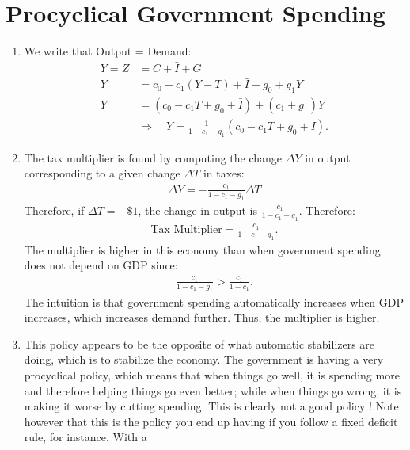 \documentclass[]{book}
\theoremstyle{definition}
\theoremstyle{definition}
\theoremstyle{definition}
\theoremstyle{remark}
\begin{document}
\section*{Procyclical Government
Spending}\label{procyclical-government-spending-1}

\begin{enumerate}
\def\labelenumi{\arabic{enumi}.}
\item
  We write that Output = Demand: \[
  \begin{aligned}
  Y=Z &=C+\bar{I}+G\\
  Y   &=c_{0}+c_{1}\left(Y-T\right)+ \bar{I} + g_{0}+g_{1}Y\\
  Y   &=\left(c_{0}-c_{1}T+g_{0}+\bar{I}\right)+\left(c_{1}+g_{1}\right)Y \\
  & \Rightarrow \quad \boxed{Y=\frac{1}{1-c_{1}-g_{1}}\left(c_{0}-c_{1}T+g_{0}+\bar{I}\right)}.
  \end{aligned}
  \]
\item
  The tax multiplier is found by computing the change \(\Delta Y\) in
  output corresponding to a given change \(\Delta T\) in taxes: \[
  \begin{aligned}
  \Delta Y = -\frac{c_1}{1-c_1-g_1}\Delta T
  \end{aligned}
  \] Therefore, if \(\Delta T = -\$ 1\), the change in output is
  \(\frac{c_1}{1-c_1-g_1}\). Therefore: \[
  \begin{aligned}
  \boxed{\text{Tax Multiplier} = \frac{c_1}{1-c_1-g_1}}.
  \end{aligned}
  \] The multiplier is higher in this economy than when government
  spending does not depend on GDP since: \[
  \begin{aligned}
  \frac{c_1}{1-c_1-g_1}>\frac{c_1}{1-c_1}.
  \end{aligned}
  \] The intuition is that government spending automatically increases
  when GDP increases, which increases demand further. Thus, the
  multiplier is higher.
\item
  This policy appears to be the opposite of what automatic stabilizers
  are doing, which is to stabilize the economy. The government is having
  a very procyclical policy, which means that when things go well, it is
  spending more and therefore helping things go even better; while when
  things go wrong, it is making it worse by cutting spending. This is
  clearly not a good policy ! Note however that this is the policy you
  end up having if you follow a fixed deficit rule, for instance. With a

\end{enumerate}
\end{document}
